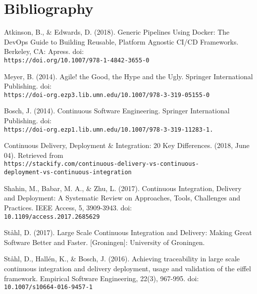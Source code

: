 \documentclass[11pt,a4paper]{article}
\begin{document}
\section{Bibliography}
\begin{thebibliography}{9}
	Atkinson, B., \& Edwards, D. (2018). Generic Pipelines Using Docker: The DevOps Guide to Building Reusable, Platform Agnostic CI/CD Frameworks. Berkeley, CA: Apress. doi:\\\texttt{https://doi.org/10.1007/978-1-4842-3655-0}
	
	Meyer, B. (2014). Agile! the Good, the Hype and the Ugly. Springer International Publishing. doi:\\\texttt{https://doi-org.ezp3.lib.umn.edu/10.1007/978-3-319-05155-0}
	
	Bosch, J. (2014). Continuous Software Engineering. Springer International Publishing. doi:\\\texttt{https://doi-org.ezp1.lib.umn.edu/10.1007/978-3-319-11283-1.}
	
	Continuous Delivery, Deployment \& Integration: 20 Key Differences. (2018, June 04). Retrieved from \\\texttt{https://stackify.com/continuous-delivery-vs-continuous-\\deployment-vs-continuous-integration}
	
	Shahin, M., Babar, M. A., \& Zhu, L. (2017). Continuous Integration, Delivery and Deployment: A Systematic Review on Approaches, Tools, Challenges and Practices. IEEE Access, 5, 3909-3943. doi:\\\texttt{10.1109/access.2017.2685629}
	
	 St\aa hl, D. (2017). 
	Large Scale Continuous Integration and Delivery: Making Great Software Better and Faster. [Groningen]: University of Groningen.
	
	St\aa hl, D., Hall\'{e}n, K., \& Bosch, J. (2016). Achieving traceability in large scale continuous integration and delivery deployment, usage and validation of the eiffel framework. Empirical Software Engineering, 22(3), 967-995. doi:\\\texttt{10.1007/s10664-016-9457-1}
\end{thebibliography}
\end{document}
